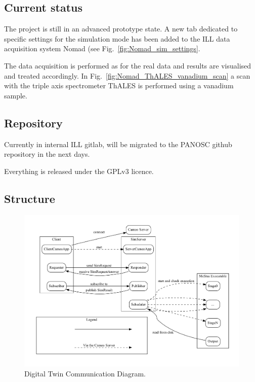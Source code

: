 \documentclass[11pt, a4paper]{article}
\begin{document}
\subsection{Current status}
The project is still in an advanced prototype state.
A new tab dedicated to specific settings for the simulation mode has been added
to the ILL data acquisition system Nomad (see Fig.~\ref{fig:Nomad_sim_settings}.

The data acquisition is performed as for the real data and results are visualised and treated accordingly. 
In Fig.~\ref{fig:Nomad_ThALES_vanadium_scan} a scan with the triple axis spectrometer ThALES is performed using a vanadium sample.

\subsection{Repository}
Currently in internal ILL gitlab, will be migrated to the PANOSC github repository in the next days.

Everything is released under the GPLv3 licence.

\subsection{Structure}
\begin{figure}[tbh]
\includegraphics[width=\textwidth]{figures/communication.dot.pdf}
\caption{Digital Twin Communication Diagram.}
\label{fig:DT_comm}
\end{figure}
\end{document}
